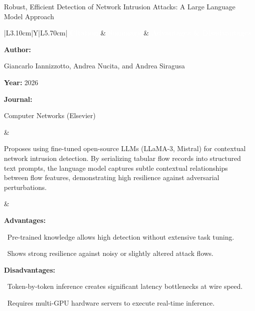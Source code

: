 \documentclass[aspectratio=169,10pt]{beamer}
\newcommand{\lrhdr}{%
  \rowcolor{prismNavy}%
  {\scriptsize\textcolor{white}{\textbf{Citation}}} &
  {\scriptsize\textcolor{white}{\textbf{Summary}}} &
  {\scriptsize\textcolor{white}{\textbf{Advantages \& Disadvantages}}} \\}
\begin{document}
\begin{frame}[t]{Robust, Efficient Detection of Network Intrusion Attacks: A Large Language Model Approach}
\vspace{-0.30em}
{\footnotesize\setlength{\tabcolsep}{3.5pt}\renewcommand{\arraystretch}{1.10}
\begin{tabularx}{\textwidth}{|L{3.10cm}|Y|L{5.70cm}|}
\hline\lrhdr\hline
\begin{minipage}[t]{\linewidth}\fontsize{7.2pt}{9.2pt}\raggedright\selectfont
\textbf{Author:}\par
Giancarlo Iannizzotto, Andrea Nucita, and Andrea Siragusa\par\vspace{4pt}
\textbf{Year:} 2026\par\vspace{4pt}
\textbf{Journal:}\par
Computer Networks (Elsevier)\par\vspace{4pt}
\end{minipage}
&
\begin{minipage}[t]{\linewidth}\fontsize{7.2pt}{9.2pt}\raggedright\selectfont
Proposes using fine-tuned open-source LLMs (LLaMA-3, Mistral) for contextual network intrusion detection. By serializing tabular flow records into structured text prompts, the language model captures subtle contextual relationships between flow features, demonstrating high resilience against adversarial perturbations.\par\vspace{4pt}
\end{minipage}
&
\begin{minipage}[t]{\linewidth}\fontsize{7.2pt}{9.0pt}\raggedright\selectfont
\textcolor{strengthGreen}{\textbf{Advantages:}}\par\vspace{1.5pt}
\textbullet~Pre-trained knowledge allows high detection without extensive task tuning.\par\vspace{2.0pt}\textbullet~Shows strong resilience against noisy or slightly altered attack flows.\par\vspace{4.0pt}
\textcolor{limitRed}{\textbf{Disadvantages:}}\par\vspace{1.5pt}
\textbullet~Token-by-token inference creates significant latency bottlenecks at wire speed.\par\vspace{2.0pt}\textbullet~Requires multi-GPU hardware servers to execute real-time inference.\par\vspace{4pt}
\end{minipage} \\\hline
\end{tabularx}}
\end{frame}
\end{document}
